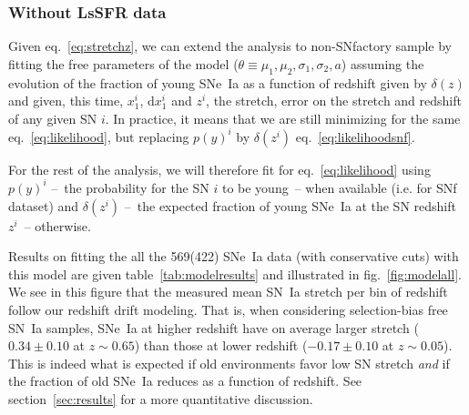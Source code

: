 \documentclass[]{aa} %
\newcommand{\mr}[1]{{\textcolor[rgb]{0.60,0.10,0.6}{#1}}}
\begin{document}
\subsubsection{Without LsSFR data}
\label{sec:modelnopy}

Given eq.~\ref{eq:stretchz}, we can extend the analysis to non-SNfactory sample
by fitting the free parameters of the model
($\theta\equiv{\mu_1,\mu_2,\sigma_1,\sigma_2,a}$) assuming the evolution of the
fraction of young SNe~Ia as a function of redshift given by $\delta(z)$ and
given, this time, $x_1^{i}$,  $\mathrm{d}x^{i}_{1}$ and $z^{i}$, the stretch,
error on the stretch and redshift of any given SN $i$. In practice, it means
that we are still minimizing for the same eq.~\ref{eq:likelihood}, but replacing
$p(y)^{i}$ by $\delta(z^{i})$ eq.~\ref{eq:likelihoodsnf}. 

\mr{For the rest of the analysis, we will therefore fit for
eq.~\ref{eq:likelihood} using $p(y)^{i}$ --~the probability for the SN $i$ to be
young~-- when available (i.e. for SNf dataset) and $\delta(z^{i})$ --~the
expected fraction of young SNe~Ia at the SN redshift $z^{i}$~-- otherwise.}

\mr{Results on fitting the all the 569(422) SNe~Ia data (with conservative cuts)
with this model are given table~\ref{tab:modelresults} and illustrated in
fig.~\ref{fig:modelall}. We see in this figure that the measured mean SN~Ia
stretch per bin of redshift follow our redshift drift modeling. That is, when
considering selection-bias free SN~Ia samples, SNe~Ia at higher redshift have on
average larger stretch ($0.34 \pm 0.10$ at $z\sim0.65$) than those at lower
redshift ($-0.17\pm 0.10$ at $z\sim0.05$). This is indeed what is expected if
old environments favor low SN stretch \citep[e.g.]{howell2007} \textit{and} if
the fraction of old SNe~Ia reduces as a function of redshift. See
section~\ref{sec:results} for a more quantitative discussion.}
\end{document}
